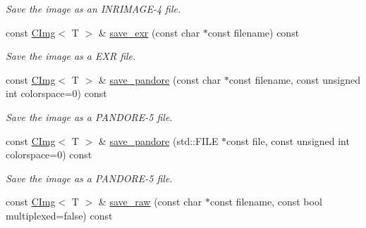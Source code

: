 \begin{DoxyCompactItemize}
\begin{DoxyCompactList}\small\item\em Save the image as an INRIMAGE-\/4 file. \item\end{DoxyCompactList}\item 
\hypertarget{structcimg__library_1_1CImg_af935682e0dd0ec7ac8cbcc2e796758f8}{
const \hyperlink{structcimg__library_1_1CImg}{CImg}$<$ T $>$ \& \hyperlink{structcimg__library_1_1CImg_af935682e0dd0ec7ac8cbcc2e796758f8}{save\_\-exr} (const char $\ast$const filename) const }
\label{structcimg__library_1_1CImg_af935682e0dd0ec7ac8cbcc2e796758f8}

\begin{DoxyCompactList}\small\item\em Save the image as a EXR file. \item\end{DoxyCompactList}\item 
\hypertarget{structcimg__library_1_1CImg_ac651db37bf02a8558de8052b2a1fe1a9}{
const \hyperlink{structcimg__library_1_1CImg}{CImg}$<$ T $>$ \& \hyperlink{structcimg__library_1_1CImg_ac651db37bf02a8558de8052b2a1fe1a9}{save\_\-pandore} (const char $\ast$const filename, const unsigned int colorspace=0) const }
\label{structcimg__library_1_1CImg_ac651db37bf02a8558de8052b2a1fe1a9}

\begin{DoxyCompactList}\small\item\em Save the image as a PANDORE-\/5 file. \item\end{DoxyCompactList}\item 
\hypertarget{structcimg__library_1_1CImg_a69553dc97d7d20a57da659cd257719b9}{
const \hyperlink{structcimg__library_1_1CImg}{CImg}$<$ T $>$ \& \hyperlink{structcimg__library_1_1CImg_a69553dc97d7d20a57da659cd257719b9}{save\_\-pandore} (std::FILE $\ast$const file, const unsigned int colorspace=0) const }
\label{structcimg__library_1_1CImg_a69553dc97d7d20a57da659cd257719b9}

\begin{DoxyCompactList}\small\item\em Save the image as a PANDORE-\/5 file. \item\end{DoxyCompactList}\item 
\hypertarget{structcimg__library_1_1CImg_a40a4739e731f2ebba21beb1d1541e69f}{
const \hyperlink{structcimg__library_1_1CImg}{CImg}$<$ T $>$ \& \hyperlink{structcimg__library_1_1CImg_a40a4739e731f2ebba21beb1d1541e69f}{save\_\-raw} (const char $\ast$const filename, const bool multiplexed=false) const }
\label{structcimg__library_1_1CImg_a40a4739e731f2ebba21beb1d1541e69f}


\end{DoxyCompactItemize}
